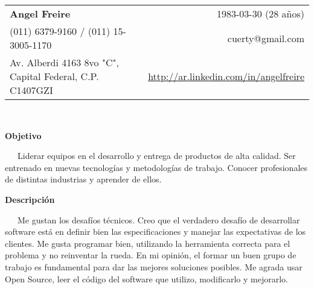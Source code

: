 \documentclass[a4paper,11pt]{article}
\newcommand{\resheading}[1]{{\large \colorbox{mygrey}{\begin{minipage}{\textwidth}{\textbf{#1 \vphantom{p\^{E}}}}\end{minipage}}}}
\begin{document}
\newcommand{\myheader}{
\begin{tabular*}{6.85in}{l@{\extracolsep{\fill}}r}
	\textbf{\LARGE Angel Freire}  & 1983-03-30 (28 a\~nos)\\
	(011) 6379-9160 / (011) 15-3005-1170 & cuerty@gmail.com \\
	Av. Alberdi 4163 8vo "C", Capital Federal, C.P. C1407GZI & \href{http://ar.linkedin.com/in/angelfreire}{http://ar.linkedin.com/in/angelfreire} \\
	\end{tabular*}
\\
\vspace{0.1in}}

\myheader


\resheading{Objetivo}
	\begin{description}
		\item {
            \ \ \ Liderar equipos en el desarrollo y entrega de productos de
            alta calidad. Ser entrenado en nuevas tecnolog\'ias y metodolog\'ias
            de trabajo. Conocer profesionales de distintas industrias y aprender
            de ellos.
        }
	\end{description}


\resheading{Descripci\'on}
	\begin{description}
		\item {
            \ \ \ Me gustan los desaf\'ios t\'ecnicos. Creo que el verdadero
            desaf\'io de desarrollar software est\'a en definir bien las
            especificaciones y manejar las expectativas de los clientes. Me
            gusta programar bien, utilizando la herramienta correcta para el
            problema y no reinventar la rueda. En mi opini\'on, el formar un
            buen grupo de trabajo es fundamental para dar las mejores
            soluciones posibles. Me agrada usar Open Source, leer el c\'odigo del
            software que utilizo, modificarlo y mejorarlo.
        }
	\end{description}

\end{document}
